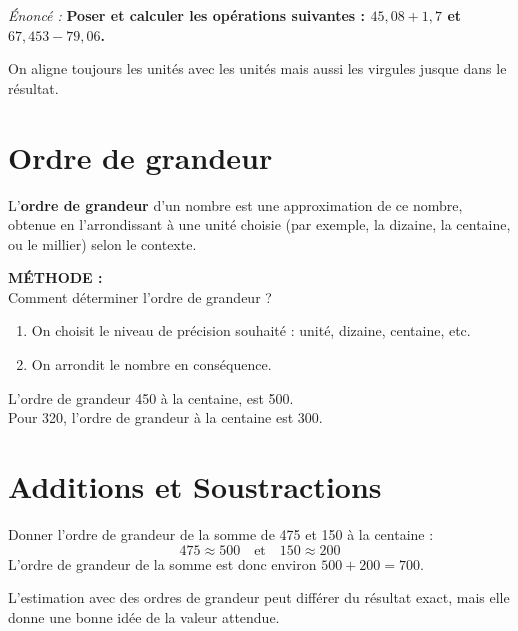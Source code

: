 \documentclass[11pt]{article}
\begin{document}
\textit{Énoncé : }\textbf{Poser et calculer les opérations suivantes : $45,08+1,7$ et $67,453-79,06$.} \\

\hfill {} \hfill {} \hfill \hfill

\begin{remarque}
  On aligne toujours les unités avec les unités mais aussi les
  virgules jusque dans le résultat.
\end{remarque}

\section{Ordre de grandeur}

\begin{definition}
L'\textbf{ordre de grandeur} d'un nombre est une approximation de ce nombre, obtenue en l'arrondissant à une unité choisie (par exemple, la dizaine, la centaine, ou le millier) selon le contexte.
\end{definition}

\textbf{MÉTHODE :} \\
Comment déterminer l'ordre de grandeur ?
\begin{enumerate}
    \item On choisit le niveau de précision souhaité : unité, dizaine, centaine, etc.
    \item On arrondit le nombre en conséquence.
\end{enumerate}

\begin{exemple}
L'ordre de grandeur 450 à la centaine, est 500. \\
Pour 320, l'ordre de grandeur à la centaine est 300. \\
\end{exemple}

\section{Additions et Soustractions}

\begin{exemple}
Donner l'ordre de grandeur de la somme de 475 et 150  à la centaine :
\[
475 \approx 500 \quad \text{et} \quad 150 \approx 200
\]
L'ordre de grandeur de la somme est donc environ \(500 + 200 = 700\).
\end{exemple}

\begin{remarque}
L'estimation avec des ordres de grandeur peut différer du résultat exact, mais elle donne une bonne idée de la valeur attendue.
\end{remarque}
\end{document}
